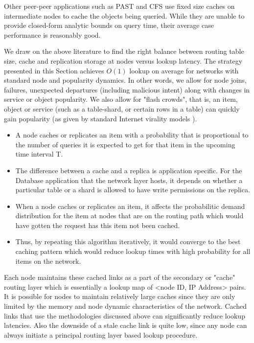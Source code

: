 Other peer-peer applications such as PAST \cite{past} and CFS \cite{cfs} use fixed size caches on intermediate nodes to
cache the objects being queried. While they are unable to provide closed-form analytic bounds on query time, their
average case performance is reasonably good.

We draw on the above literature to find the right balance between routing table size, cache and replication storage at
nodes versus lookup latency. The strategy presented in this Section achieves \(O(1)\) lookup on average for networks
with standard node and popularity dynamics. In other words, we allow for node joins, failures, unexpected departures
(including malicious intent) along with changes in service or object popularity. We also allow for "flash crowds", that
is, an item, object or service (such as a table-shard, or certain rows in a table) can quickly gain popularity (as given
by standard Internet virality models \cite{virality_model}).

\begin{itemize}
    \item A node caches or replicates an item with a probability that is proportional to the number of queries it is
        expected to get for that item in the upcoming time interval T.
    \item The difference between a cache and a replica is application specific. For the Database application that the
        network layer hosts, it depends on whether a particular table or a shard is allowed to have write permissions on
        the replica.
    \item When a node caches or replicates an item, it affects the probabilitic demand distribution for the item at
        nodes that are on the routing path which would have gotten the request has this item not been cached.
    \item Thus, by repeating this algorithm iteratively, it would converge to the best caching pattern which would reduce
        lookup times with high probability for all items on the network.
\end{itemize}

Each node maintains these cached links as a part of the secondary or "cache" routing layer which is essentially a lookup
map of <node ID, IP Address> pairs. It is possible for nodes to maintain relatively large caches since they are only
limited by the memory and node dynamic characteristics of the network. Cached links that use the methodologies discussed
above can significantly reduce lookup latencies. Also the downside of a stale cache link is quite low, since any node
can always initiate a principal routing layer based lookup procedure.

